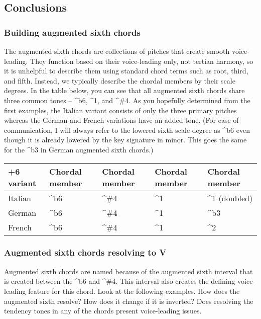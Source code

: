 \documentclass{book}
\begin{document}
\hypertarget{conclusions-4}{%
\subsection{Conclusions}\label{conclusions-4}}

\hypertarget{building-augmented-sixth-chords}{%
\subsubsection{Building augmented sixth
chords}\label{building-augmented-sixth-chords}}

The augmented sixth chords are collections of pitches that create smooth
voice-leading. They function based on their voice-leading only, not tertian
harmony, so it is unhelpful to describe them using standard chord terms such
as root, third, and fifth. Instead, we typically describe the chordal members
by their scale degrees. In the table below, you can see that all augmented
sixth chords share three common tones -- \^{}b6, \^{}1, and \^{}\#4. As you
hopefully determined from the first examples, the Italian variant consists of
only the three primary pitches whereas the German and French variations have
an added tone. (For ease of communication, I will always refer to the lowered
sixth scale degree as \^{}b6 even though it is already lowered by the key
signature in minor. This goes the same for the \^{}b3 in German augmented
sixth chords.)

\begin{longtable}[]{@{}lllll@{}}
\toprule
+6 variant & Chordal member & Chordal member & Chordal member & Chordal
member \\
\midrule
\endhead
Italian & \^{}b6 & \^{}\#4 & \^{}1 & \^{}1 (doubled) \\
German & \^{}b6 & \^{}\#4 & \^{}1 & \^{}b3 \\
French & \^{}b6 & \^{}\#4 & \^{}1 & \^{}2 \\
\bottomrule
\end{longtable}

\hypertarget{augmented-sixth-chords-resolving-to-v}{%
\subsubsection{Augmented sixth chords resolving to
V}\label{augmented-sixth-chords-resolving-to-v}}

Augmented sixth chords are named because of the augmented sixth interval that
is created between the \^{}b6 and \^{}\#4. This interval also creates the
defining voice-leading feature for this chord. Look at the following examples.
How does the augmented sixth resolve? How does it change if it is inverted?
Does resolving the tendency tones in any of the chords present voice-leading
issues.
\end{document}
